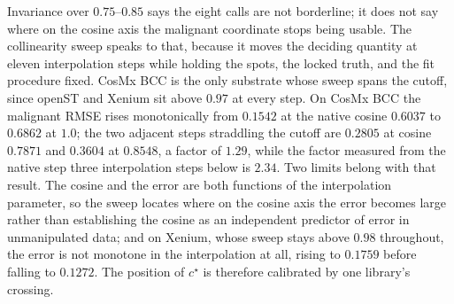 Invariance over \(0.75\)--\(0.85\) says the eight calls are not borderline; it does not say where on the cosine axis the malignant coordinate stops being usable. The collinearity sweep speaks to that, because it moves the deciding quantity at eleven interpolation steps while holding the spots, the locked truth, and the fit procedure fixed. CosMx BCC is the only substrate whose sweep spans the cutoff, since openST and Xenium sit above \(0.97\) at every step. On CosMx BCC the malignant RMSE rises monotonically from \(0.1542\) at the native cosine \(0.6037\) to \(0.6862\) at \(1.0\); the two adjacent steps straddling the cutoff are \(0.2805\) at cosine \(0.7871\) and \(0.3604\) at \(0.8548\), a factor of \(1.29\), while the factor measured from the native step three interpolation steps below is \(2.34\). Two limits belong with that result. The cosine and the error are both functions of the interpolation parameter, so the sweep locates where on the cosine axis the error becomes large rather than establishing the cosine as an independent predictor of error in unmanipulated data; and on Xenium, whose sweep stays above \(0.98\) throughout, the error is not monotone in the interpolation at all, rising to \(0.1759\) before falling to \(0.1272\). The position of \(c^\star\) is therefore calibrated by one library's crossing.

